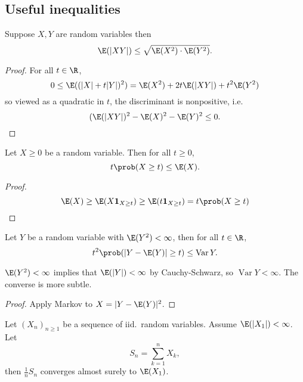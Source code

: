 \documentclass[a4paper]{article}
\renewcommand{\P}{\prob} %
\DeclareMathOperator{\var}{Var} %
\begin{document}
\subsection{Useful inequalities}

\begin{proposition}
  Suppose \(X, Y\) are random variables then
  \[
    \E(|XY|) \leq \sqrt{\E(X^2) \cdot \E(Y^2)}.
  \]
\end{proposition}

\begin{proof}
  For all \(t \in \R\),
  \[
    0 \leq \E((|X| + t|Y|)^2) = \E(X^2) + 2t \E(|XY|) + t^2\E(Y^2)
  \]
  so viewed as a quadratic in \(t\), the discriminant is nonpositive, i.e.
  \[
    (\E(|XY|)^2 - \E(X)^2 - \E(Y)^2 \leq 0.
  \]
\end{proof}

\begin{proposition}[Markov]
  Let \(X \geq 0\) be a random variable. Then for all \(t \geq 0\),
  \[
    t \P(X \geq t) \leq \E(X).
  \]
\end{proposition}

\begin{proof}
  \[
    \E(X)
    \geq \E(X \mathbf 1_{X \geq t})
    \geq \E(t \mathbf 1_{X \geq t})
    = t \P(X \geq t)
  \]
\end{proof}

\begin{proposition}[Chebyshev]
  Let \(Y\) be a random variable with \(\E(Y^2) < \infty\), then for all \(t \in \R\),
  \[
    t^2 \P(|Y - \E(Y)| \geq t) \leq \var Y.
  \]
\end{proposition}

\(\E(Y^2) < \infty\) implies that \(\E(|Y|) < \infty\) by Cauchy-Schwarz, so \(\var Y < \infty\). The converse is more subtle.

\begin{proof}
  Apply Markov to \(X = |Y - \E(Y)|^2\).
\end{proof}

\begin{theorem}
  Let \((X_n)_{n \geq 1}\) be a sequence of iid.\ random variables. Assume \(\E(|X_1|) < \infty\). Let
  \[
    S_n = \sum_{k = 1}^n X_k,
  \]
  then \(\frac{1}{n} S_n\) converges almost surely to \(\E(X_1)\).
\end{theorem}
\end{document}
